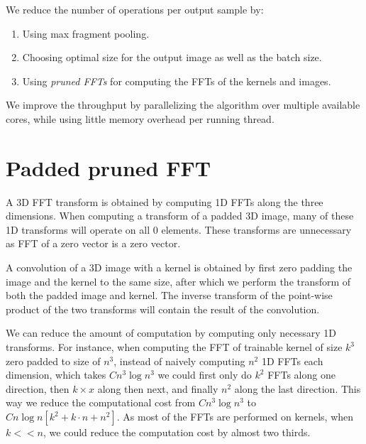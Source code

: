 \documentclass[conference]{IEEEtran}
\begin{document}
We reduce the number of operations per output sample by:
\begin{enumerate}
\item Using max fragment pooling.
\item Choosing optimal size for the output image as well as the batch
  size.
\item Using \emph{pruned FFTs} for computing the FFTs of the kernels
  and images.
\end{enumerate}

We improve the throughput by parallelizing the algorithm over multiple
available cores, while using little memory overhead per running
thread.


\section{Padded pruned FFT}

A 3D FFT transform is obtained by computing 1D FFTs along the three
dimensions.  When computing a transform of a padded 3D image, many of
these 1D transforms will operate on all $0$ elements.  These
transforms are unnecessary as FFT of a zero vector is a zero vector.

A convolution of a 3D image with a kernel is obtained by first zero
padding the image and the kernel to the same size, after which we
perform the transform of both the padded image and kernel.  The
inverse transform of the point-wise product of the two transforms will
contain the result of the convolution.

We can reduce the amount of computation by computing only necessary 1D
transforms.  For instance, when computing the FFT of trainable kernel
of size $k^3$ zero padded to size of $n^3$, instead of naively
computing $n^2$ 1D FFTs each dimension, which takes $C n^3 \log n^3$
we could first only do $k^2$ FFTs along one direction, then $k \times
x$ along then next, and finally $n^2$ along the last direction.  This
way we reduce the computational cost from $C n^3 \log n^3$ to $C n\log
n[k^2 + k \cdot n + n^2]$.  As most of the FFTs are performed on
kernels, when $k << n$, we could reduce the computation cost by almost
two thirds.
\end{document}
